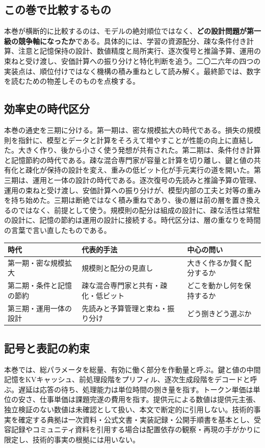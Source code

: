 \documentclass[lualatex,a4paper,10pt]{jlreq}
\begin{document}
\subsection*{この巻で比較するもの}
本巻が横断的に比較するのは、モデルの絶対順位ではなく、\textbf{どの設計問題が第一級の競争軸になったか}である。具体的には、学習の資源配分、疎な条件付き計算、注意と記憶保持の設計、数値精度と局所実行、逐次復号と推論予算、運用の束ねと受け渡し、安価計算への振り分けと特化判断を追う。二〇二六年の四つの実装点は、順位付けではなく機構の積み重ねとして読み解く。最終節では、数字を読むための物差しそのものを点検する。

\subsection*{効率史の時代区分}
本巻の通史を三期に分ける。第一期は、密な規模拡大の時代である。損失の規模則を指針に、模型とデータと計算をそろえて増やすことが性能の向上に直結した。大きく作り、後から小さく使う発想が共有された。第二期は、条件付き計算と記憶節約の時代である。疎な混合専門家が容量と計算を切り離し、鍵と値の共有化と疎化が保持の設計を変え、重みの低ビット化が手元実行の道を開いた。第三期は、運用と一体の設計の時代である。逐次復号の先読みと推論予算の管理、運用の束ねと受け渡し、安価計算への振り分けが、模型内部の工夫と対等の重みを持ち始めた。三期は断絶ではなく積み重ねであり、後の層は前の層を置き換えるのではなく、前提として使う。規模則の配分は組成の設計に、疎な活性は常駐の設計に、記憶の節約は運用の設計に接続する。時代区分は、層の重なりを時間の言葉で言い直したものである。

\begin{center}
\small
\begin{tabularx}{\textwidth}{@{}p{}p{}X@{}}
\toprule
時代 & 代表的手法 & 中心の問い \\
\midrule
第一期・密な規模拡大 & 規模則と配分の見直し & 大きく作るか賢く配分するか \\
第二期・条件と記憶の節約 & 疎な混合専門家と共有・疎化・低ビット & どこを動かし何を保持するか \\
第三期・運用一体の設計 & 先読みと予算管理と束ね・振り分け & どう捌きどう選ぶか \\
\bottomrule
\end{tabularx}
\end{center}

\subsection*{記号と表記の約束}
本巻では、総パラメータを総量、有効に働く部分を作動量と呼ぶ。鍵と値の中間記憶をKVキャッシュ、前処理段階をプリフィル、逐次生成段階をデコードと呼ぶ。遅延は応答の待ち、処理能力は単位時間の捌き量を指す。トークン単価は単位の安さ、仕事単価は課題完遂の費用を指す。提供元による数値は提供元主張、独立検証のない数値は未確認として扱い、本文で断定的に引用しない。技術的事実を確定する典拠は一次資料・公式文書・実装記録・公開手順書を基本とし、受容記録やコミュニティ資料を引用する場合は配置依存の観察・再現の手がかりに限定し、技術的事実の根拠には用いない。
\end{document}
